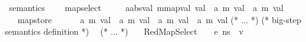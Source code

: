 

\begin{isabellebody}\isanewline
{}\isamarkupfalse%
\ semantics\ {\isacharequal}{\kern0pt}\isanewline
\ \ \ map{\isacharunderscore}{\kern0pt}select\ {\isacharcolon}{\kern0pt}{\isacharcolon}{\kern0pt}\isanewline 
\ \ \ \ {\isachardoublequoteopen}{\isacharparenleft}{\kern0pt}{\isacharprime}{\kern0pt}a{\isacharcolon}{\kern0pt}{\isacharcolon}{\kern0pt}absval{\isacharcomma}{\kern0pt}\ {\isacharprime}{\kern0pt}m{\isacharcolon}{\kern0pt}{\isacharcolon}{\kern0pt}mapval{\isacharparenright}{\kern0pt}\ val\ {\isasymRightarrow}\ {\isacharparenleft}{\kern0pt}{\isacharprime}{\kern0pt}a{\isacharcomma}{\kern0pt}\ {\isacharprime}{\kern0pt}m{\isacharparenright}{\kern0pt}\ val\ {\isasymRightarrow}\ {\isacharparenleft}{\kern0pt}{\isacharprime}{\kern0pt}a{\isacharcomma}{\kern0pt}\ {\isacharprime}{\kern0pt}m{\isacharparenright}{\kern0pt}\ val{\isachardoublequoteclose}\isanewline
\ \ \ map{\isacharunderscore}{\kern0pt}store\ \ {\isacharcolon}{\kern0pt}{\isacharcolon}{\kern0pt}\isanewline 
\ \ \ \ {\isachardoublequoteopen}{\isacharparenleft}{\kern0pt}{\isacharprime}{\kern0pt}a{\isacharcomma}{\kern0pt}\ {\isacharprime}{\kern0pt}m{\isacharparenright}{\kern0pt}\ val\ {\isasymRightarrow}\ {\isacharparenleft}{\kern0pt}{\isacharprime}{\kern0pt}a{\isacharcomma}{\kern0pt}\ {\isacharprime}{\kern0pt}m{\isacharparenright}{\kern0pt}\ val\ {\isasymRightarrow}\ {\isacharparenleft}{\kern0pt}{\isacharprime}{\kern0pt}a{\isacharcomma}{\kern0pt}\ {\isacharprime}{\kern0pt}m{\isacharparenright}{\kern0pt}\ val\ {\isasymRightarrow}\ {\isacharparenleft}{\kern0pt}{\isacharprime}{\kern0pt}a{\isacharcomma}{\kern0pt}\ {\isacharprime}{\kern0pt}m{\isacharparenright}{\kern0pt}\ val{\isachardoublequoteclose}\isanewline
{}\isanewline
\isanewline
(* ... *) \isanewline
\isanewline
(* big-step semantics definition *) \isanewline
\ \ (* ... *) \isanewline
\ \ {\isacharbar}{\kern0pt}\ RedMapSelect{\isacharcolon}{\kern0pt}\ {\isachardoublequoteopen}{\isasymlbrakk}\ {\isasymLambda}{\isacharcomma}{\kern0pt}{\isasymGamma}{\isacharcomma}{\kern0pt}{\isasymOmega}\ {\isasymturnstile}\ {\isasymlangle}e{}{\isacharcomma}{\kern0pt}\ n{\isacharunderscore}{\kern0pt}s{\isasymrangle}\ {\isasymDown}\ v{}{\isacharsemicolon}{\kern0pt}\isanewline

\end{isabellebody}
